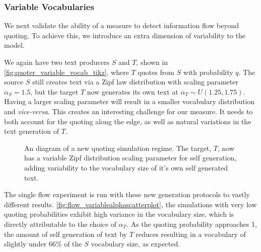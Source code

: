 \subsubsection{Variable Vocabularies}
We next validate the ability of a measure to detect information flow beyond quoting. To achieve this, we introduce an extra dimension of variability to the model. 

We again have two text producers $S$ and $T$, shown in \autoref{fig:quoter_variable_vocab_tikz}, where $T$ quotes from $S$ with probability $q$. The source $S$ still creates text via a Zipf law distribution with scaling parameter $\alpha_S=1.5$, but the target $T$ now generates its own text at $\alpha_T \sim U(1.25,1.75)$. Having a larger scaling parameter will result in a smaller vocabulary distribution and \emph{vice-versa}. This creates an interesting challenge for our measure. It needs to both account for the quoting along the edge, as well as natural variations in the text generation of $T$.

\begin{figure}[!htbp]
\centering
{}
\caption{An diagram of a new quoting simulation regime. The target, $T$, now has a variable Zipf distribution scaling parameter for self generation, adding variability to the vocabulary size of it's own self generated text.}\label{fig:quoter_variable_vocab_tikz}
\end{figure}

The single flow experiment is run with these new generation protocols to vastly different results. \autoref{fig:flow_variablealphascatterplot}, the simulations with very low quoting probabilities exhibit high variance in the vocabulary size, which is directly attributable to the choice of $\alpha_T$. As the quoting probability approaches 1, the amount of self generation of text by $T$ reduces resulting in a vocabulary of slightly under 66\% of the $S$ vocabulary size, as expected.


